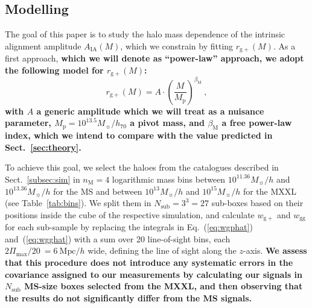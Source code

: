 \documentclass[a4paper,fleqn,usenatbib]{mnras}
\newenvironment{correction}
 {\bfseries}%
  {}%
\begin{document}
\subsection{Modelling}
\label{subsec:modelling}
The goal of this paper is to study the halo mass dependence of the intrinsic alignment amplitude $A_{\mathrm{IA}} (M)$, which we constrain by fitting $r_{\mathrm{g+}} (M)$.
As a first approach, \begin{correction}which we will denote as ``power-law'' approach\end{correction}, we adopt the following model for $r_{\mathrm{g+}} (M)$:
\begin{equation}
    r_{\mathrm{g+}} (M) = A \cdot  \left( \frac{M}{M_{\mathrm{p}}} \right)^{\beta_{\mathrm{M}}} \ ,
	\label{eq:modelrg+}
\end{equation}
with $A$ a generic amplitude which we will treat as a nuisance parameter, $M_{\mathrm{p}} = 10^{13.5} M_{\sun}/h_{70}$ a pivot mass, and $\beta_{\mathrm{M}}$ a free power-law index, which we intend to compare with the value predicted in Sect.~\ref{sec:theory}.

To achieve this goal, we select the haloes from the catalogues described in Sect.~\ref{subsec:sim} in $n_\mathrm{M} = 4$ logarithmic mass bins between $10^{11.36} M_{\sun}/h$ and $10^{13.36} M_{\sun}/h$ for the MS and between $10^{13} M_{\sun}/h$ and $10^{15} M_{\sun}/h$ for the MXXL (see Table~\ref{tab:bins}). We split them in $N_\mathrm{sub} = 3^3 = 27$ sub-boxes based on their positions inside the cube of the respective simulation, and calculate $w_{\mathrm{g+}}$ and $w_{\mathrm{gg}}$ for each sub-sample by replacing the integrals in Eq.~(\ref{eq:wgphat}) and~(\ref{eq:wgghat}) with a sum over 20 line-of-sight bins, each $2\Pi_{\mathrm{max}}/ 20 \ = 6 \ \mathrm{Mpc}/h$ wide, defining the line of sight along the $z$-axis. \begin{correction} We assess that this procedure does not introduce any systematic errors in the covariance assigned to our measurements by calculating our signals in $N_\mathrm{sub}$ MS-size boxes selected from the MXXL, and then observing that the results do not significantly differ from the MS signals.
\end{correction}
\end{document}
